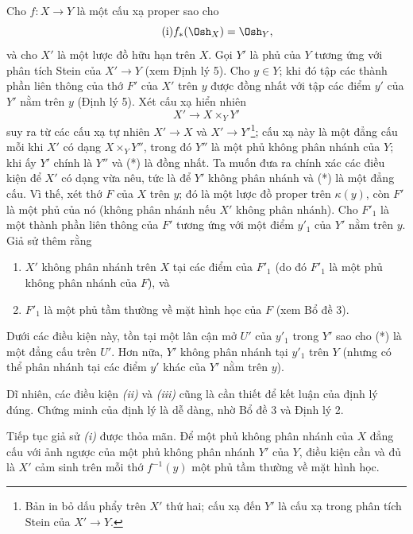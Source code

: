 Cho $f:X\longrightarrow Y$ là một cấu xạ proper sao cho
\begin{equation}
  \tag{i}
  f_*(\Osh_X)=\Osh_Y,
\end{equation}
và cho $X'$ là một lược đồ hữu hạn trên $X$. Gọi $Y'$ là phủ của $Y$ tương ứng
với phân tích Stein của $X'\longrightarrow Y$ (xem Định lý 5). Cho $y\in Y$;
khi đó tập các thành phần liên thông của thớ $F'$ của $X'$ trên $y$ được đồng
nhất với tập các điểm $y'$ của $Y'$ nằm trên $y$ (Định lý 5). Xét cấu xạ hiển
nhiên
\begin{equation}
  \tag{*}
  X'\longrightarrow X\times_Y Y'
\end{equation}
suy ra từ các cấu xạ tự nhiên $X'\longrightarrow X$ và
$X'\longrightarrow Y'$\footnote{Bản in bỏ dấu phẩy trên $X'$ thứ hai; cấu xạ
đến $Y'$ là cấu xạ trong phân tích Stein của $X'\to Y$.}; cấu xạ này là một
đẳng cấu mỗi khi $X'$ có dạng $X\times_Y Y''$, trong đó $Y''$ là một phủ không
phân nhánh của $Y$; khi ấy $Y'$ chính là $Y''$ và (*) là đồng nhất. Ta muốn
đưa ra chính xác các điều kiện để $X'$ có dạng vừa nêu, tức là để $Y'$ không
phân nhánh và (*) là một đẳng cấu. Vì thế, xét thớ $F$ của $X$ trên $y$; đó là
một lược đồ proper trên $\kappa(y)$, còn $F'$ là một phủ của nó (không phân
nhánh nếu $X'$ không phân nhánh). Cho $F'_1$ là một thành phần liên thông của
$F'$ tương ứng với một điểm $y'_1$ của $Y'$ nằm trên $y$. Giả sử thêm rằng
\begin{enumerate}
  \item[\textit{(ii)}] $X'$ không phân nhánh trên $X$ tại các điểm của $F'_1$
    (do đó $F'_1$ là một phủ không phân nhánh của $F$), và
  \item[\textit{(iii)}] $F'_1$ là một phủ tầm thường về mặt hình học của $F$
    (xem Bổ đề 3).
\end{enumerate}

 Dưới các điều kiện này, tồn tại một lân cận mở $U'$ của
$y'_1$ trong $Y'$ sao cho (*) là một đẳng cấu trên $U'$. Hơn nữa, $Y'$ không
phân nhánh tại $y'_1$ trên $Y$ (nhưng có thể phân nhánh tại các điểm $y'$ khác
của $Y'$ nằm trên $y$).

Dĩ nhiên, các điều kiện \textit{(ii)} và \textit{(iii)} cũng là cần thiết để
kết luận của định lý đúng. Chứng minh của định lý là dễ dàng, nhờ Bổ đề 3 và
Định lý 2.


 Tiếp tục giả sử \textit{(i)} được thỏa mãn. Để một phủ
không phân nhánh của $X$ đẳng cấu với ảnh ngược của một phủ không phân
nhánh $Y'$ của $Y$, điều kiện cần và đủ là $X'$ cảm sinh trên mỗi thớ
$f^{-1}(y)$ một phủ tầm thường về mặt hình học.

